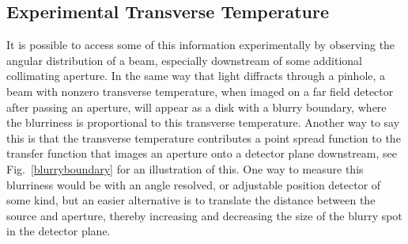 \subsection{Experimental Transverse Temperature}

It is possible to access some of this information experimentally by observing the angular distribution of a beam, especially downstream of some additional collimating aperture.
In the same way that light diffracts through a pinhole, a beam with nonzero transverse temperature, when imaged on a far field detector after passing an aperture, will appear as a disk with a blurry boundary, where the blurriness is proportional to this transverse temperature.
Another way to say this is that the transverse temperature contributes a point spread function to the transfer function that images an aperture onto a detector plane downstream, see Fig.~\ref{blurryboundary} for an illustration of this.
One way to measure this blurriness would be with an angle resolved, or adjustable position detector of some kind, but an easier alternative is to translate the distance between the source and aperture, thereby increasing and decreasing the size of the blurry spot in the detector plane.

